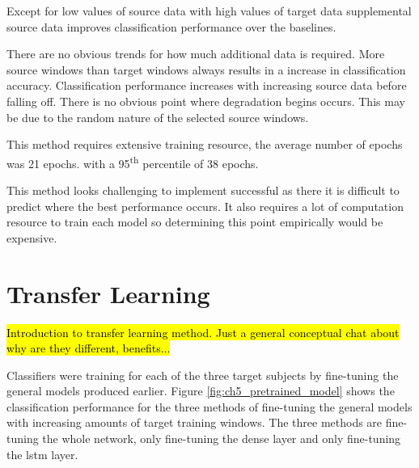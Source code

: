 

Except for low values of source data with high values of target data supplemental source data improves classification performance over the baselines. 

There are no obvious trends for how much additional data is required. More source windows than target windows always results in a increase in classification accuracy. Classification performance increases with increasing source data before falling off. There is no obvious point where degradation begins occurs. This may be due to the random nature of the selected source windows.

This method requires extensive training resource, the average number of epochs was 21 epochs. with a 95\textsuperscript{th} percentile of 38 epochs.

This method looks challenging to implement successful as there it is difficult to predict where the best performance occurs. It also requires a lot of computation resource to train each model so determining this point empirically would be expensive.

\section{Transfer Learning}
\label{sec:model-personalisation-results-transfer}
\hl{Introduction to transfer learning method. Just a general conceptual chat about why are they different, benefits...}

Classifiers were training for each of the three target subjects by fine-tuning the general models produced earlier. Figure \ref{fig:ch5_pretrained_model} shows the classification performance for the three methods of fine-tuning the general models with increasing amounts of target training windows. The three methods are fine-tuning the whole network, only fine-tuning the dense layer and only fine-tuning the \acrshort{lstm} layer.

